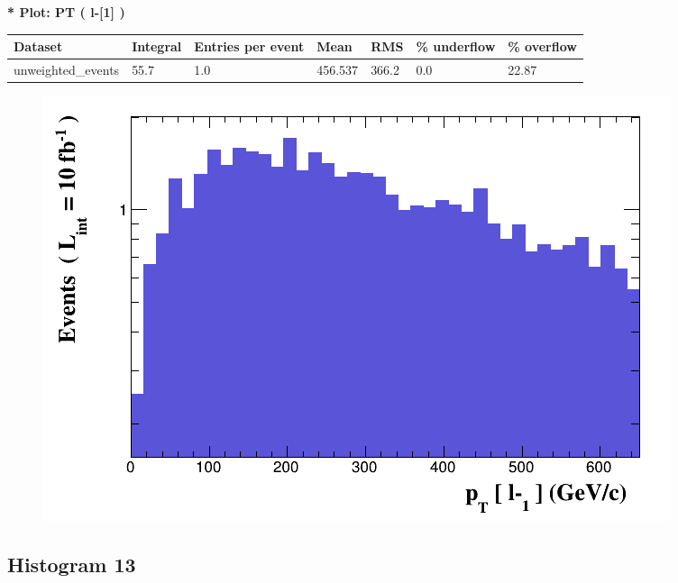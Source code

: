 \documentclass[a4paper, 10pt]{article}
\begin{document}
\textbf{* Plot: PT ( l-[1] ) }\\
   \begin{table}[H]
  \begin{center}
    \begin{tabular}{|m{23.0mm}|m{23.0mm}|m{18.0mm}|m{19.0mm}|m{19.0mm}|m{19.0mm}|m{19.0mm}|}
      \hline
      {\cellcolor{yellow}         Dataset}& {\cellcolor{yellow}         Integral}& {\cellcolor{yellow}         Entries per event}& {\cellcolor{yellow}         Mean}& {\cellcolor{yellow}         RMS}& {\cellcolor{yellow}         \% underflow}& {\cellcolor{yellow}         \% overflow}\\
      \hline
      {\cellcolor{white}         unweighted\_events}& {\cellcolor{white}         55.7}& {\cellcolor{white}         1.0}& {\cellcolor{white}         456.537}& {\cellcolor{white}         366.2}& {\cellcolor{red}         0.0}& {\cellcolor{red}         22.87}\\
\hline
    \end{tabular}
  \end{center}
\end{table}

\begin{figure}[H]
  \begin{center}
    \includegraphics[scale=0.45]{selection_11.png}\\
\caption{   }
  \end{center}
\end{figure}
      \newpage
\subsection{ Histogram 13}
\end{document}
